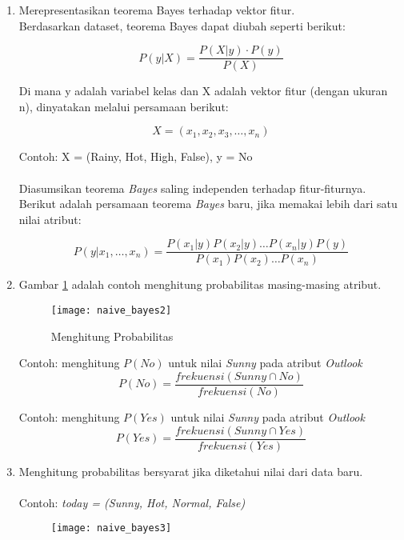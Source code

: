 \begin{enumerate}
\item Merepresentasikan teorema Bayes terhadap vektor fitur.\\
Berdasarkan dataset, teorema Bayes dapat diubah seperti berikut:

\begin{equation}
P(y|X) = \frac{P(X|y) \cdot P(y)}{P(X)}
\end{equation}

Di mana y adalah variabel kelas dan X adalah vektor fitur (dengan ukuran n), dinyatakan melalui persamaan berikut:

\begin{equation}
X = (x_1, x_2, x_3, \ldots, x_n)
\end{equation}

Contoh: X = (Rainy, Hot, High, False), y = No
\\\\
Diasumsikan teorema \textit{Bayes} saling independen terhadap fitur-fiturnya. Berikut adalah persamaan teorema \textit{Bayes} baru, jika memakai lebih dari satu nilai atribut:

\begin{equation}
P(y|x_1,\ldots,x_n) = \frac{P(x_1|y) P(x_2|y) \ldots P(x_n|y) P(y)}{P(x_1) P(x_2) \ldots P(x_n)}
\end{equation}


\item Gambar \ref{fig:naive_bayes2} adalah contoh menghitung probabilitas masing-masing atribut.

\begin{figure}[H]
	\centering
	\texttt{[image: naive\_bayes2]}
	\caption{Menghitung Probabilitas}
	\label{fig:naive_bayes2}
\end{figure}

Contoh: menghitung $P(No)$ untuk nilai \textit{Sunny} pada atribut \textit{Outlook}
\begin{equation}
P(No) = \frac{frekuensi(Sunny \cap No)}{frekuensi(No)}
\end{equation}

Contoh: menghitung $P(Yes)$ untuk nilai \textit{Sunny} pada atribut \textit{Outlook}
\begin{equation}
P(Yes) = \frac{frekuensi(Sunny \cap Yes)}{frekuensi(Yes)}
\end{equation}

\item Menghitung probabilitas bersyarat jika diketahui nilai dari data baru. \\\\
Contoh: \textit{today = (Sunny, Hot, Normal, False)}
\begin{figure}[H]
	\centering
	\texttt{[image: naive\_bayes3]}
	\label{fig:naive_bayes3}
\end{figure}


\end{enumerate}
